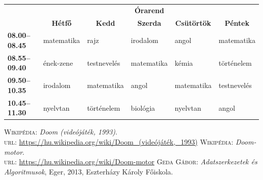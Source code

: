 \documentclass{thesis-ekf}
\theoremstyle{definition}
\begin{document}
\begin{table}[h]
    \centering
    \footnotesize
    \begin{tabular}{|>{\bfseries}l|l|l|l|l|l|}
        \cline{2-6}
        \multicolumn{1}{c|}{} &
        \multicolumn{5}{c|}{\textbf{Órarend}}\\
        \cline{2-6}
        \multicolumn{1}{c|}{} &
        \multicolumn{1}{c|}{\textbf{Hétfő}} &
        \multicolumn{1}{c|}{\textbf{Kedd}} &
        \multicolumn{1}{c|}{\textbf{Szerda}} &
        \multicolumn{1}{c|}{\textbf{Csütörtök}} &
        \multicolumn{1}{c|}{\textbf{Péntek}}\\
        \hline
        08.00--08.45 &
        matematika &
        rajz &
        irodalom &
        angol &
        matematika\\
        \hline
        08.55--09.40 &
        ének-zene &
        testnevelés &
        matematika &
        kémia &
        történelem\\
        \hline
        09.50--10.35 &
        irodalom &
        matematika &
        angol &
        matematika &
        testnevelés\\
        \hline
        10.45--11.30 &
        nyelvtan &
        történelem &
        biológia &
        nyelvtan &
        angol\\
        \hline
    \end{tabular}
\end{table}

\begin{thebibliography}{2}
     \textsc{Wikipédia}: \emph{Doom (videójáték, 1993)}.\\
    \textsc{url}: \url{https://hu.wikipedia.org/wiki/Doom_(videójáték,_1993)}
     \textsc{Wikipédia}: \emph{Doom-motor}.\\\textsc{url}:
    \url{https://hu.wikipedia.org/wiki/Doom-motor}
     \textsc{Geda Gábor}: \emph{Adatszerkezetek és Algoritmusok},
    Eger, 2013, Eszterházy Károly Főiskola.
\end{thebibliography}


\end{document}
